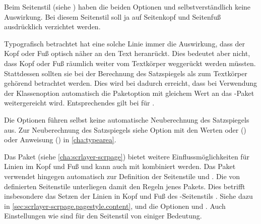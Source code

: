 Beim Seitenstil %
 (siehe
) %
haben die beiden Optionen  und
 selbstverständlich keine Auswirkung. Bei diesem
Seitenstil soll ja auf Seitenkopf und
Seitenfuß ausdrücklich verzichtet werden.

Typografisch betrachtet hat eine solche Linie immer
die Auswirkung, dass der Kopf oder Fuß optisch näher an den Text heranrückt.
Dies bedeutet aber nicht, dass Kopf oder Fuß räumlich weiter vom
Textkörper weggerückt werden müssten.  Stattdessen sollten
sie bei der Berechnung des Satzspiegels als zum Textkörper gehörend
betrachtet werden. Dies wird bei  dadurch erreicht, dass bei
Verwendung der Klassenoption  automatisch die Paketoption
%
 mit gleichem Wert an das
\hyperref[cha:typearea]{}-Paket weitergereicht
wird. Entsprechendes gilt bei  für
%
.

Die Optionen führen selbst keine automatische Neuberechnung des Satzspiegels
aus. Zur Neuberechnung des Satzspiegels siehe Option
 mit den Werten  oder
 () oder Anweisung
() in \autoref{cha:typearea}.

Das Paket \hyperref[cha:scrlayer-scrpage]{}%
%
 (siehe
\autoref{cha:scrlayer-scrpage}) bietet weitere Einflussmöglichkeiten für
Linien im Kopf und Fuß und kann auch mit  kombiniert
werden. Das Paket  verwendet hingegen automatisch
\hyperref[cha:scrlayer-scrpage]{} zur Definition der
Seitenstile  und
.  Die von
 definierten Seitenstile
unterliegen damit den Regeln jenes Pakets. Dies betrifft insbesondere das
Setzen der Linien in Kopf und Fuß des
\hyperref[\LabelBase.pagestyle.plain.letter]{}-Seitenstils
. Siehe dazu in
\autoref{sec:scrlayer-scrpage.pagestyle.content},
 und
 die Optionen
 und
. Auch Einstellungen wie
 sind für den Seitenstil
 von einiger Bedeutung.%
%
\EndIndexGroup


